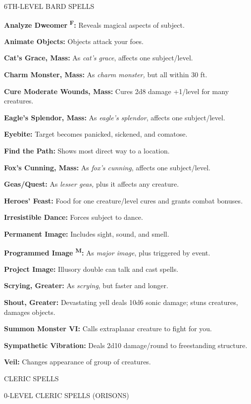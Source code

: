 \documentclass{article}
\begin{document}
6TH-LEVEL BARD SPELLS

\textbf{Analyze Dweomer }\textsuperscript{\textbf{F}}\textbf{:} Reveals magical 
aspects of subject.

\textbf{Animate Objects:} Objects attack your foes.

\textbf{Cat's Grace, Mass:} As \textit{cat's grace}, affects one subject/level.

\textbf{Charm Monster, Mass:} As \textit{charm monster, }but all within 30 ft.

\textbf{Cure Moderate Wounds, Mass:} Cures 2d8 damage +1/level for many creatures.

\textbf{Eagle's Splendor, Mass:} As \textit{eagle's splendor}, affects one subject/level.

\textbf{Eyebite:} Target becomes panicked, sickened, and comatose.

\textbf{Find the Path:} Shows most direct way to a location.

\textbf{Fox's Cunning, Mass:} As \textit{fox's cunning}, affects one subject/level.

\textbf{Geas/Quest:} As \textit{lesser geas, }plus it affects any creature.

\textbf{Heroes' Feast:} Food for one creature/level cures and grants combat bonuses\textit{.}

\textbf{Irresistible Dance:} Forces subject to dance.

\textbf{Permanent Image:} Includes sight, sound, and smell.

\textbf{Programmed Image }\textsuperscript{\textbf{M}}\textbf{:} As \textit{major 
image}, plus triggered by event.

\textbf{Project Image:} Illusory double can talk and cast spells.

\textbf{Scrying, Greater:} As \textit{scrying}, but faster and longer.

\textbf{Shout, Greater:} Devastating yell deals 10d6 sonic damage; stuns creatures, 
damages objects.

\textbf{Summon Monster VI:} Calls extraplanar creature to fight for you.

\textbf{Sympathetic Vibration:} Deals 2d10 damage/round to freestanding structure.

\textbf{Veil:} Changes appearance of group of creatures.

\vspace{12pt}
{\LARGE{}CLERIC SPELLS}

0-LEVEL CLERIC SPELLS (ORISONS)
\end{document}
